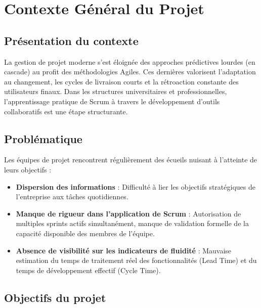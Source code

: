 \documentclass[12pt,a4paper]{report}
\begin{document}

\chapter{Contexte Général du Projet}

\section{Présentation du contexte}

La gestion de projet moderne s'est éloignée des approches prédictives lourdes (en cascade) au profit des méthodologies Agiles. Ces dernières valorisent l'adaptation au changement, les cycles de livraison courts et la rétroaction constante des utilisateurs finaux. Dans les structures universitaires et professionnelles, l'apprentissage pratique de Scrum à travers le développement d'outils collaboratifs est une étape structurante.

\section{Problématique}

Les équipes de projet rencontrent régulièrement des écueils nuisant à l'atteinte de leurs objectifs :
\begin{itemize}
\item \textbf{Dispersion des informations} : Difficulté à lier les objectifs stratégiques de l'entreprise aux tâches quotidiennes.
\item \textbf{Manque de rigueur dans l'application de Scrum} : Autorisation de multiples sprints actifs simultanément, manque de validation formelle de la capacité disponible des membres de l'équipe.
\item \textbf{Absence de visibilité sur les indicateurs de fluidité} : Mauvaise estimation du temps de traitement réel des fonctionnalités (Lead Time) et du temps de développement effectif (Cycle Time).
\end{itemize}

\section{Objectifs du projet}
\end{document}
